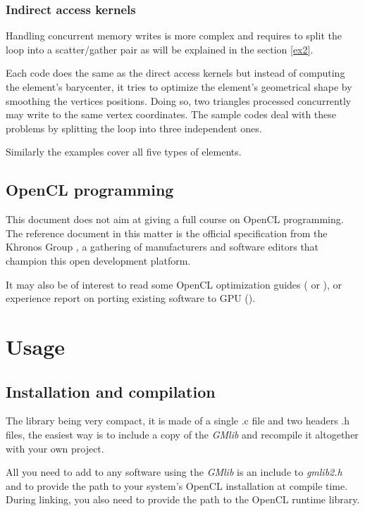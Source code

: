 \documentclass[a4paper,12pt]{article}
\begin{document}
\subsubsection*{Indirect access kernels}
Handling concurrent memory writes is more complex and requires to split the loop into a scatter/gather pair as will be explained in the section \ref{ex2}.

Each code does the same as the direct access kernels but instead of computing the element's barycenter, it tries to optimize the element's geometrical shape by smoothing the vertices positions. Doing so, two triangles processed concurrently may write to the same vertex coordinates. The sample codes deal with these problems by splitting the loop into three independent ones.

Similarly the examples cover all five types of elements.


\subsection{OpenCL programming}
This document does not aim at giving a full course on OpenCL programming. The reference document in this matter is the official specification from the Khronos Group \cite{khronos}, a gathering of manufacturers and software editors that champion this open development platform.

It may also be of interest to read some OpenCL optimization guides (\cite{nvidia} or \cite{apple}), or experience report on porting existing software to GPU (\cite{lohner}).


%
%

\section{Usage}
\label{util}
\subsection{Installation and compilation}
The library being very compact, it is made of a single .c file and two headers .h files, the easiest way is to include a copy of the \emph{GMlib} and recompile it altogether with your own project.

All you need to add to any software using the \emph{GMlib} is an include to \emph{gmlib2.h} and to provide the path to your system's OpenCL installation at compile time. During linking, you also need to provide the path to the OpenCL runtime library.
\end{document}
